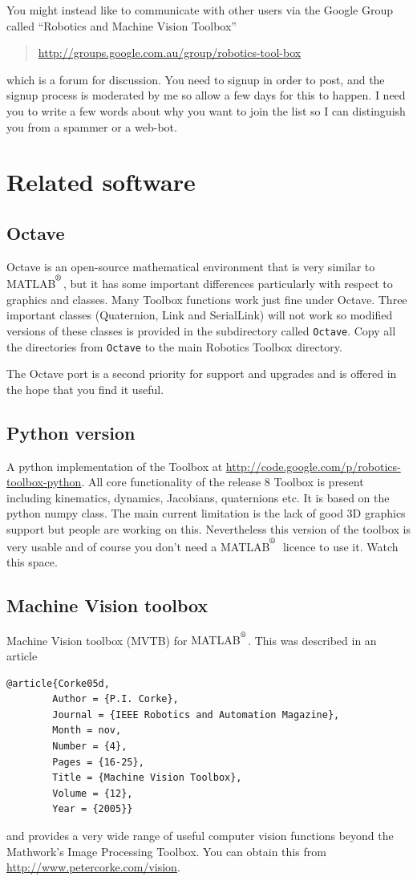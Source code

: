 \documentclass[a4paper]{report}
\def\Mlab{MATLAB$^{\textsuperscript{\textregistered}}$}
\begin{document}
{You might instead like to communicate with other users via 
the Google Group called ``Robotics and Machine Vision Toolbox'' 
\begin{quote}
\url{http://groups.google.com.au/group/robotics-tool-box}
\end{quote}
which is a forum for discussion.
You need to signup in order to post, and the signup process is moderated by me so allow a few
days for this to happen.  I need you to write a few words about why you want to join the list
so I can distinguish you from a spammer or a web-bot.

\section{Related software}

\subsection{Octave}
Octave is an open-source mathematical environment that is very similar to \Mlab, but it has some important differences particularly with respect
to graphics and classes.
Many Toolbox functions work just fine under Octave.
Three important classes (Quaternion, Link and SerialLink) will not work so modified versions of these classes is provided in the subdirectory
called \texttt{Octave}.  Copy all the directories from \texttt{Octave} to the main Robotics Toolbox directory.

The Octave port is a second priority for support and upgrades and is offered in the hope that you find it useful. 

\subsection{Python version}
A python implementation of the Toolbox at \url{http://code.google.com/p/robotics-toolbox-python}.
All core functionality of the release 8 Toolbox is present including kinematics, dynamics, Jacobians,
quaternions etc.  It is based on the python numpy class.  The main current limitation is the lack of good 3D graphics support
but people are working on this.  Nevertheless this version of the toolbox is very usable and of course you don't need a \Mlab\ licence
to use it.  Watch this space.

\subsection{Machine Vision toolbox}
Machine Vision toolbox (MVTB) for {\Mlab}.  This was described in an article
\begin{verbatim}
@article{Corke05d,
        Author = {P.I. Corke},
        Journal = {IEEE Robotics and Automation Magazine},
        Month = nov,
        Number = {4},
        Pages = {16-25},
        Title = {Machine Vision Toolbox},
        Volume = {12},
        Year = {2005}}
\end{verbatim}
and provides a very wide range of useful computer vision functions beyond the Mathwork's Image Processing
Toolbox.  You can obtain this from \url{http://www.petercorke.com/vision}.

}
\end{document}
